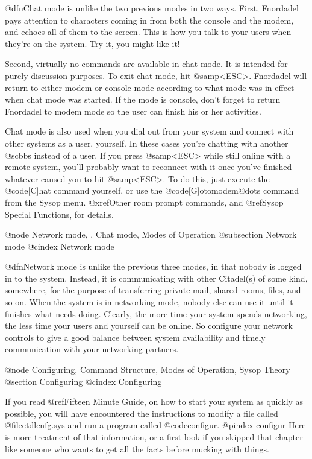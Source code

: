@dfn{Chat mode} is unlike the two previous modes in two ways.
First, Fnordadel pays attention to characters coming in from
both the console and the modem, and echoes all of them to the
screen.  This is how you talk to your users when they're on the
system.  Try it, you might like it!

Second, virtually no commands are available in chat
mode.  It is intended for purely discussion purposes.  To exit
chat mode, hit @samp{<ESC>}.  Fnordadel will return to either modem
or console mode according to what mode was in effect when chat
mode was started.  If the mode is console, don't forget to
return Fnordadel to modem mode so the user can finish his or
her activities.

Chat mode is also used when you dial out from your
system and connect with other systems as a user, yourself.  In
these cases you're chatting with another @sc{bbs} instead of a user.
If you press @samp{<ESC>} while still online with a remote system,
you'll probably want to reconnect with it once you've finished
whatever caused you to hit @samp{<ESC>}.  To do this, just execute the
@code{[C]hat} command yourself, or use the
@code{[G]otomodem@dots{}} command from the
Sysop menu.  @xref{Other room prompt commands}, and
@ref{Sysop Special Functions}, for details.

@node Network mode,  , Chat mode, Modes of Operation
@subsection Network mode
@cindex Network mode

@dfn{Network mode} is unlike the previous three modes, in that
nobody is logged in to the system.  Instead, it is communicating
with other Citadel(s) of some kind, somewhere, for the purpose of
transferring private mail, shared rooms, files, and so on.  When
the system is in networking mode, nobody else can use it until it
finishes what needs doing.  Clearly, the more time your system
spends networking, the less time your users and yourself can be
online.  So configure your network controls to give a good
balance between system availability and timely communication
with your networking partners.

@node Configuring, Command Structure, Modes of Operation, Sysop Theory
@section Configuring
@cindex Configuring

If you read @ref{Fifteen Minute Guide}, on how to start your system
as quickly as possible, you will have encountered the instructions to
modify a file called @file{ctdlcnfg.sys} and run a program called
@code{configur}.
@pindex configur
Here is more treatment of that information, or a first look if you
skipped that chapter like someone who wants to get all the facts before
mucking with things.

